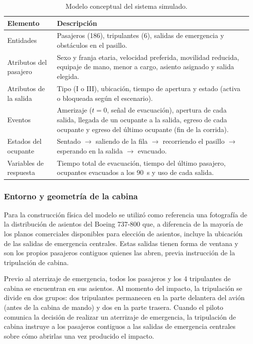 \documentclass[a4paper, 11pt]{article}
\begin{document}
\begin{table}[H]
\centering
\small
\begin{tabular}{L{2.6cm} L{11.4cm}}
\toprule
\textbf{Elemento} & \textbf{Descripci\'on} \\
\midrule
Entidades & Pasajeros (186), tripulantes (6), salidas de emergencia y
obst\'aculos en el pasillo. \\
Atributos del pasajero & Sexo y franja etaria, velocidad preferida, movilidad
reducida, equipaje de mano, menor a cargo, asiento asignado y salida elegida. \\
Atributos de la salida & Tipo (I o III), ubicaci\'on, tiempo de apertura y estado
(activa o bloqueada seg\'un el escenario). \\
Eventos & Amerizaje ($t=0$, se\~nal de evacuaci\'on), apertura de cada salida,
llegada de un ocupante a la salida, egreso de cada ocupante y egreso del \'ultimo
ocupante (fin de la corrida). \\
Estados del ocupante & Sentado $\rightarrow$ saliendo de la fila $\rightarrow$
recorriendo el pasillo $\rightarrow$ esperando en la salida $\rightarrow$
evacuado. \\
Variables de respuesta & Tiempo total de evacuaci\'on, tiempo del \'ultimo
pasajero, ocupantes evacuados a los 90~s y uso de cada salida. \\
\bottomrule
\end{tabular}
\caption{Modelo conceptual del sistema simulado.}
\label{tab:conceptual}
\end{table}

\subsubsection{Entorno y geometr\'ia de la cabina}\label{sub:entorno}

Para la construcci\'on f\'isica del modelo se utiliz\'o como referencia una
fotograf\'ia de la distribuci\'on de asientos del Boeing 737-800 que, a diferencia
de la mayor\'ia de los planos comerciales disponibles para elecci\'on de asientos,
incluye la ubicaci\'on de las salidas de emergencia centrales. Estas salidas tienen
forma de ventana y son los propios pasajeros contiguos quienes las abren, previa
instrucci\'on de la tripulaci\'on de cabina.

Previo al aterrizaje de emergencia, todos los pasajeros y los 4 tripulantes de
cabina se encuentran en sus asientos. Al momento del impacto, la tripulaci\'on se
divide en dos grupos: dos tripulantes permanecen en la parte delantera del avi\'on
(antes de la cabina de mando) y dos en la parte trasera. Cuando el piloto comunica
la decisi\'on de realizar un aterrizaje de emergencia, la tripulaci\'on de cabina
instruye a los pasajeros contiguos a las salidas de emergencia centrales sobre
c\'omo abrirlas una vez producido el impacto.
\end{document}
